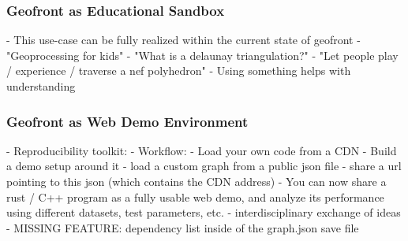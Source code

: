 


















\subsubsection{Geofront as Educational Sandbox}
- This use-case can be fully realized within the current state of geofront
- "Geoprocessing for kids"
- "What is a delaunay triangulation?" 
- "Let people play / experience / traverse a nef polyhedron"
- Using something helps with understanding

\subsubsection{Geofront as Web Demo Environment}
- Reproducibility toolkit:
- Workflow: 
  - Load your own code from a CDN
  - Build a demo setup around it
  - load a custom graph from a public json file
  - share a url pointing to this json (which contains the CDN address)
- You can now share a rust / C++ program as a fully usable web demo,   
  and analyze its performance using different datasets, test parameters, etc. 
- interdisciplinary exchange of ideas
- MISSING FEATURE: dependency list inside of the graph.json save file

